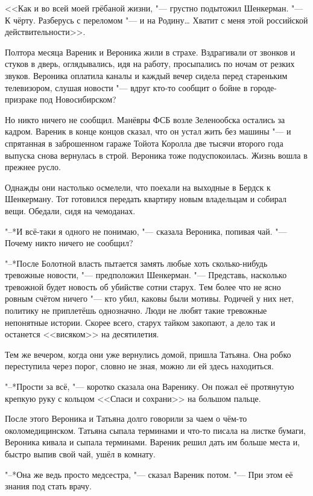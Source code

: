 <<Как и во всей моей грёбаной жизни, "--- грустно подытожил Шенкерман.
"--- К чёрту.
Разберусь с переломом "--- и на Родину\dots{}
Хватит с меня этой российской действительности>>.

\asterism

Полтора месяца Вареник и Вероника жили в страхе.
Вздрагивали от звонков и стуков в дверь, оглядывались, идя на работу, просыпались по ночам от резких звуков.
Вероника оплатила каналы и каждый вечер сидела перед стареньким телевизором, слушая новости "--- вдруг кто-то сообщит о бойне в городе-призраке под Новосибирском?

Но никто ничего не сообщил.
Манёвры ФСБ возле Зеленообска остались за кадром.
Вареник в конце концов сказал, что он устал жить без машины "--- и спрятанная в заброшенном гараже Тойота Королла две тысячи второго года выпуска снова вернулась в строй.
Вероника тоже подуспокоилась.
Жизнь вошла в прежнее русло.

Однажды они настолько осмелели, что поехали на выходные в Бердск к Шенкерману.
Тот готовился передать квартиру новым владельцам и собирал вещи.
Обедали, сидя на чемоданах.

"--*И всё-таки я одного не понимаю, "--- сказала Вероника, попивая чай.
"--- Почему никто ничего не сообщил?

"--*После Болотной власть пытается замять любые хоть сколько-нибудь тревожные новости, "--- предположил Шенкерман.
"--- Представь, насколько тревожной будет новость об убийстве сотни старух.
Тем более что не ясно ровным счётом ничего "--- кто убил, каковы были мотивы.
Родичей у них нет, политику не приплетёшь однозначно.
Люди не любят такие тревожные непонятные истории.
Скорее всего, старух тайком закопают, а дело так и останется <<висяком>> на десятилетия.

Тем же вечером, когда они уже вернулись домой, пришла Татьяна.
Она робко переступила через порог, словно не зная, можно ли ей здесь находиться.

"--*Прости за всё, "--- коротко сказала она Варенику.
Он пожал её протянутую крепкую руку с кольцом <<Спаси и сохрани>> на большом пальце.

После этого Вероника и Татьяна долго говорили за чаем о чём-то околомедицинском.
Татьяна сыпала терминами и что-то писала на листке бумаги, Вероника кивала и сыпала терминами.
Вареник решил дать им больше места и, быстро выпив свой чай, ушёл в комнату.

"--*Она же ведь просто медсестра, "--- сказал Вареник потом.
"--- При этом её знания под стать врачу.


